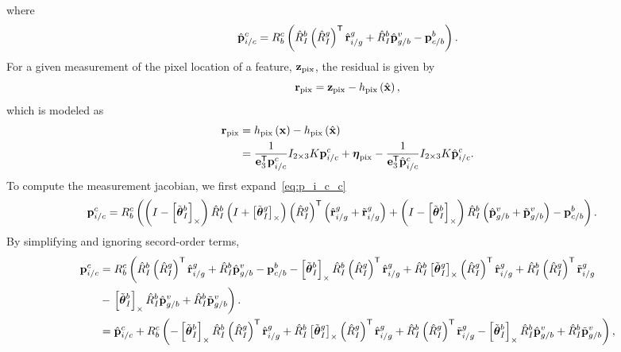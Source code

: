 where
\begin{align}
  \hat{\boldsymbol{\mathrm{p}}}_{i/c}^c = R_b^c \left( \hat{R}_I^b \left( \hat{R}_I^g \right)^{\mathsf{T}}
  \hat{\boldsymbol{\mathrm{r}}}_{i/g}^g + \hat{R}_I^b \hat{\boldsymbol{\mathrm{p}}}_{g/b}^v - \boldsymbol{\mathrm{p}}_{c/b}^b
\right).
\end{align}
For a given measurement of the pixel location of a feature,
$\boldsymbol{\mathrm{z}}_{\text{pix}}$, the residual is given by
\begin{equation}
  \boldsymbol{\mathrm{r}}_{\text{pix}} = \boldsymbol{\mathrm{z}}_{\text{pix}} - h_{\text{pix}} \left( \hat{\boldsymbol{\mathrm{x}}}
    \right),
\end{equation}
which is modeled as
\begin{align}
  \boldsymbol{\mathrm{r}}_{\text{pix}} &= h_{\text{pix}} \left( \boldsymbol{\mathrm{x}} \right) - h_{\text{pix}} \left( \hat{\boldsymbol{\mathrm{x}}}
    \right) \\
  &= \frac{1}{\boldsymbol{\mathrm{e}}_3^{\mathsf{T}} \boldsymbol{\mathrm{p}}_{i/c}^c} I_{2 \times 3} K
  \boldsymbol{\mathrm{p}}_{i/c}^c + \boldsymbol{\mathrm{\eta}}_{\text{pix}} - \frac{1}{\boldsymbol{\mathrm{e}}_3^{\mathsf{T}} \hat{\boldsymbol{\mathrm{p}}}_{i/c}^c} I_{2 \times 3} K
  \hat{\boldsymbol{\mathrm{p}}}_{i/c}^c.
\end{align}
To compute the measurement jacobian, we first expand~\eqref{eq:p_i_c_c}
\begin{align}
  \boldsymbol{\mathrm{p}}_{i/c}^c &= R_b^c \left( \left( I - \left[ \tilde{\boldsymbol{\mathrm{\theta}}}_I^b
     \right]_{\times} \right) \hat{R}_I^b \left( I + \left[ \tilde{\boldsymbol{\mathrm{\theta}}}_I^g  \right]_{\times}
  \right) \left( \hat{R}_I^g \right)^{\mathsf{T}}
\left( \hat{\boldsymbol{\mathrm{r}}}_{i/g}^g  + \tilde{\boldsymbol{\mathrm{r}}}_{i/g}^g \right) + \left( I - \left[ \tilde{\boldsymbol{\mathrm{\theta}}}_I^b
 \right]_{\times} \right) \hat{R}_I^b \left( \hat{\boldsymbol{\mathrm{p}}}_{g/b}^v + \tilde{\boldsymbol{\mathrm{p}}}_{g/b}^v \right) - \boldsymbol{\mathrm{p}}_{c/b}^b \right).
\end{align}
By simplifying and ignoring secord-order terms,
\begin{align*}
  \boldsymbol{\mathrm{p}}_{i/c}^c &= R_b^c \left( \hat{R}_I^b \left( \hat{R}_I^g \right)^{\mathsf{T}}
  \hat{\boldsymbol{\mathrm{r}}}_{i/g}^g + \hat{R}_I^b \hat{\boldsymbol{\mathrm{p}}}_{g/b}^v - \boldsymbol{\mathrm{p}}_{c/b}^b
  - \left[ \tilde{\boldsymbol{\mathrm{\theta}}}_I^b \right]_{\times} \hat{R}_I^b \left( \hat{R}_I^g
    \right)^{\mathsf{T}} \hat{\boldsymbol{\mathrm{r}}}_{i/g}^g + \hat{R}_I^b
    \left[ \tilde{\boldsymbol{\mathrm{\theta}}}_I^g \right]_{\times} \left( \hat{R}_I^g
  \right)^{\mathsf{T}} \hat{\boldsymbol{\mathrm{r}}}_{i/g}^g +
\hat{R}_I^b \left( \hat{R}_I^g
    \right)^{\mathsf{T}} \tilde{\boldsymbol{\mathrm{r}}}_{i/g}^g \right. \\
                   &- \left. \left[ \tilde{\boldsymbol{\mathrm{\theta}}}_I^b \right]_{\times} \hat{R}_I^b \hat{\boldsymbol{\mathrm{p}}}_{g/b}^v
    + \hat{R}_I^b \tilde{\boldsymbol{\mathrm{p}}}_{g/b}^v
   \right). \\
    &= \hat{\boldsymbol{\mathrm{p}}}_{i/c}^c
    + R_b^c \left( 
  - \left[ \tilde{\boldsymbol{\mathrm{\theta}}}_I^b \right]_{\times} \hat{R}_I^b \left( \hat{R}_I^g
    \right)^{\mathsf{T}} \hat{\boldsymbol{\mathrm{r}}}_{i/g}^g + \hat{R}_I^b
    \left[ \tilde{\boldsymbol{\mathrm{\theta}}}_I^g \right]_{\times} \left( \hat{R}_I^g
  \right)^{\mathsf{T}} \hat{\boldsymbol{\mathrm{r}}}_{i/g}^g +
\hat{R}_I^b \left( \hat{R}_I^g
    \right)^{\mathsf{T}} \tilde{\boldsymbol{\mathrm{r}}}_{i/g}^g
                   - \left[ \tilde{\boldsymbol{\mathrm{\theta}}}_I^b \right]_{\times} \hat{R}_I^b \hat{\boldsymbol{\mathrm{p}}}_{g/b}^v
    + \hat{R}_I^b \tilde{\boldsymbol{\mathrm{p}}}_{g/b}^v
   \right), 
\end{align*}

